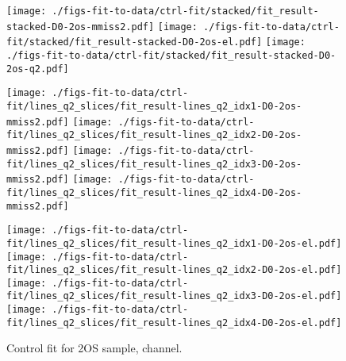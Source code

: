 \begin{figure}[htb]
    \centering
    \texttt{[image: ./figs-fit-to-data/ctrl-fit/stacked/fit\_result-stacked-D0-2os-mmiss2.pdf]}
    \texttt{[image: ./figs-fit-to-data/ctrl-fit/stacked/fit\_result-stacked-D0-2os-el.pdf]}
    \texttt{[image: ./figs-fit-to-data/ctrl-fit/stacked/fit\_result-stacked-D0-2os-q2.pdf]}

    \texttt{[image: ./figs-fit-to-data/ctrl-fit/lines\_q2\_slices/fit\_result-lines\_q2\_idx1-D0-2os-mmiss2.pdf]}
    \texttt{[image: ./figs-fit-to-data/ctrl-fit/lines\_q2\_slices/fit\_result-lines\_q2\_idx2-D0-2os-mmiss2.pdf]}
    \texttt{[image: ./figs-fit-to-data/ctrl-fit/lines\_q2\_slices/fit\_result-lines\_q2\_idx3-D0-2os-mmiss2.pdf]}
    \texttt{[image: ./figs-fit-to-data/ctrl-fit/lines\_q2\_slices/fit\_result-lines\_q2\_idx4-D0-2os-mmiss2.pdf]}

    \texttt{[image: ./figs-fit-to-data/ctrl-fit/lines\_q2\_slices/fit\_result-lines\_q2\_idx1-D0-2os-el.pdf]}
    \texttt{[image: ./figs-fit-to-data/ctrl-fit/lines\_q2\_slices/fit\_result-lines\_q2\_idx2-D0-2os-el.pdf]}
    \texttt{[image: ./figs-fit-to-data/ctrl-fit/lines\_q2\_slices/fit\_result-lines\_q2\_idx3-D0-2os-el.pdf]}
    \texttt{[image: ./figs-fit-to-data/ctrl-fit/lines\_q2\_slices/fit\_result-lines\_q2\_idx4-D0-2os-el.pdf]}

    \caption{Control fit for 2OS sample, \Dz channel.}
    \label{fig:ctrl-2os-d0}
\end{figure}

